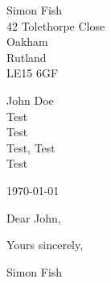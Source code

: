 \documentclass{article}
\def \recipforename {John}
\def \recipsurname {Doe}
\edef \recipname {\recipforename{ }\recipsurname}
\def \recipgreeting {Dear \recipforename}
\def \recipsignoff {Yours sincerely}
\def \recipaddresslineone {Test}
\def \recipaddresslinetwo {Test}
\def \reciptown {Test}
\def \recipcounty {Test}
\def \recippostcode {Test}
\def \recipaddress{
  \recipaddresslineone \\
  \recipaddresslinetwo \\
  \reciptown, \recipcounty \\
  \recippostcode
}
\begin{document}
\setlength{\parindent}{0em}
\begin{flushright}
	Simon Fish\\
	42 Tolethorpe Close\\
	Oakham\\
	Rutland\\
	LE15 6GF\\
\end{flushright}

\recipname \\
\recipaddress

\bigskip

\today
\bigskip

\recipgreeting,
\setlength{\parindent}{2em}
\setlength{\parskip}{0.5cm plus4mm minus3mm}
\bigskip


\bigskip

\recipsignoff,

\vspace{2\baselineskip}

Simon Fish
\end{document}
